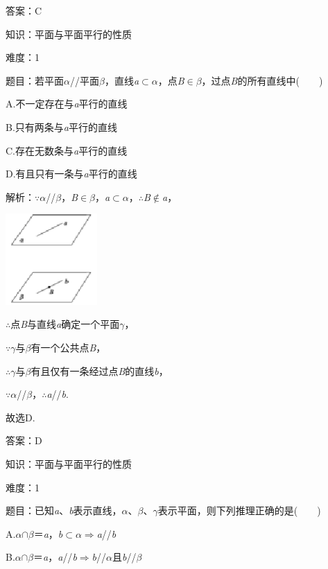 \documentclass{article} %
\begin{document}
答案：C

知识：平面与平面平行的性质

难度：1

题目：若平面\textit{$\alpha$}//平面\textit{$\beta$}，直线\textit{a}$\mathrm{\subset }$\textit{$\alpha$}，点\textit{B}$\mathrm{\in}$\textit{$\beta$}，过点\textit{B}的所有直线中(　　)

A.不一定存在与\textit{a}平行的直线

B.只有两条与\textit{a}平行的直线

C.存在无数条与\textit{a}平行的直线

D.有且只有一条与\textit{a}平行的直线

解析：$\mathrm{\because}$\textit{$\alpha$}//\textit{$\beta$}，\textit{B}$\mathrm{\in}$\textit{$\beta$}，\textit{a}$\mathrm{\subset }$\textit{$\alpha$}，$\mathrm{\therefore}$\textit{B}$\mathrm{\notin}$\textit{a}，

\includegraphics*[width=1.38in, height=1.37in, keepaspectratio=false]{image175}

$\mathrm{\therefore}$点\textit{B}与直线\textit{a}确定一个平面\textit{$\gamma$}，

$\mathrm{\because}$\textit{$\gamma$}与\textit{$\beta$}有一个公共点\textit{B}，

$\mathrm{\therefore}$\textit{$\gamma$}与\textit{$\beta$}有且仅有一条经过点\textit{B}的直线\textit{b}，

$\mathrm{\because}$\textit{$\alpha$}//\textit{$\beta$}，$\mathrm{\therefore}$\textit{a}//\textit{b}.

故选D.

答案：D

知识：平面与平面平行的性质

难度：1

题目：已知\textit{a}、\textit{b}表示直线，\textit{$\alpha$}、\textit{$\beta$}、\textit{$\gamma$}表示平面，则下列推理正确的是(　　)

A.\textit{$\alpha$}$\mathrm{\cap}$\textit{$\beta$}＝\textit{a}，\textit{b}$\mathrm{\subset }$\textit{$\alpha$}$\mathrm{\Rightarrow }$\textit{a}//\textit{b}

B.\textit{$\alpha$}$\mathrm{\cap}$\textit{$\beta$}＝\textit{a}，\textit{a}//\textit{b}$\mathrm{\Rightarrow }$\textit{b}//\textit{$\alpha$}且\textit{b}//\textit{$\beta$}
\end{document}
